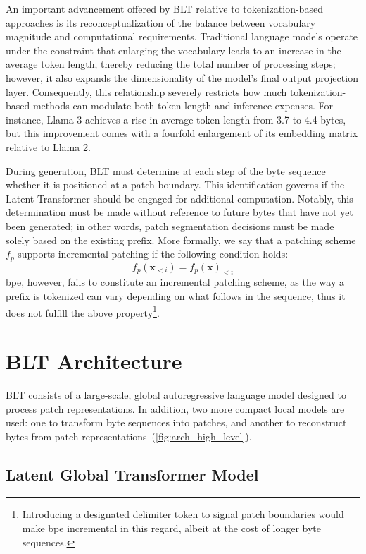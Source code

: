An important advancement offered by {\textsc BLT} relative to tokenization-based approaches is its reconceptualization of the balance between vocabulary magnitude and computational requirements. Traditional language models operate under the constraint that enlarging the vocabulary leads to an increase in the average token length, thereby reducing the total number of processing steps; however, it also expands the dimensionality of the model's final output projection layer. Consequently, this relationship severely restricts how much tokenization-based methods can modulate both token length and inference expenses. For instance, Llama 3 achieves a rise in average token length from 3.7 to 4.4 bytes, but this improvement comes with a fourfold enlargement of its embedding matrix relative to Llama 2.

During generation, {\textsc BLT} must determine at each step of the byte sequence whether it is positioned at a patch boundary. This identification governs if the Latent Transformer should be engaged for additional computation. Notably, this determination must be made without reference to future bytes that have not yet been generated; in other words, patch segmentation decisions must be made solely based on the existing prefix. More formally, we say that a patching scheme $f_p$ supports incremental patching if the following condition holds:
$$f_p(\pmb{x}_{<i}) = f_p(\pmb{x})_{<i}$$
bpe, however, fails to constitute an incremental patching scheme, as the way a prefix is tokenized can vary depending on what follows in the sequence, thus it does not fulfill the above property\footnote{Introducing a designated delimiter token to signal patch boundaries would make bpe incremental in this regard, albeit at the cost of longer byte sequences.}.

\section{{\textsc BLT} Architecture}
\label{section:architecture}
{\textsc BLT} consists of a large-scale, global autoregressive language model designed to process patch representations. In addition, two more compact local models are used: one to transform byte sequences into patches, and another to reconstruct bytes from patch representations~(\autoref{fig:arch_high_level}).

\subsection{Latent Global Transformer Model}

